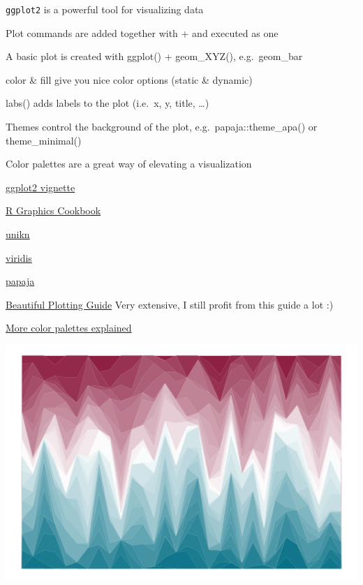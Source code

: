 \documentclass[
]{book}
\begin{document}
\texttt{ggplot2} is a powerful tool for visualizing data

Plot commands are added together with + and executed as one

A basic plot is created with ggplot() + geom\_XYZ(), e.g.~geom\_bar

color \& fill give you nice color options (static \& dynamic)

labs() adds labels to the plot (i.e.~x, y, title, \ldots)

Themes control the background of the plot, e.g.~papaja::theme\_apa() or theme\_minimal()

Color palettes are a great way of elevating a visualization

\href{https://ggplot2.tidyverse.org/articles/ggplot2.html}{ggplot2 vignette}

\href{https://r-graphics.org/}{R Graphics Cookbook}

\href{https://hneth.github.io/unikn/index.html}{unikn}

\href{https://sjmgarnier.github.io/viridisLite/reference/viridis.html}{viridis}

\href{https://www.rdocumentation.org/packages/papaja/versions/0.1.2}{papaja}

\href{https://www.cedricscherer.com/2019/08/05/a-ggplot2-tutorial-for-beautiful-plotting-in-r/}{Beautiful Plotting Guide} Very extensive, I still profit from this guide a lot :)

\href{http://www.sthda.com/english/wiki/ggplot2-colors-how-to-change-colors-automatically-and-manually}{More color palettes explained}

\includegraphics{_main_files/figure-html/unikn-plot-1.pdf}
\end{document}
